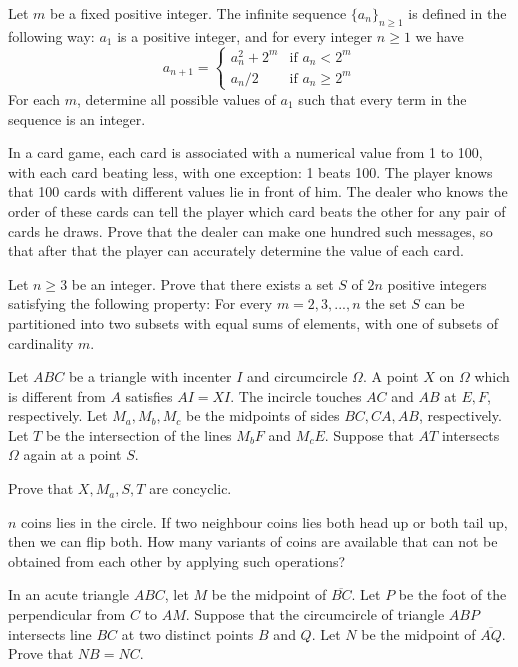 \documentclass[11pt]{scrartcl}
\begin{document}
\begin{problem}[613109155420064]
Let $m$ be a fixed positive integer. The infinite sequence $\{a_n\}_{n\geq 1}$ is defined in the following way: $a_1$ is a positive integer, and for every integer $n\geq 1$ we have
$$a_{n+1} = \begin{cases}a_n^2+2^m & \text{if } a_n< 2^m \\ a_n/2 &\text{if } a_n\geq 2^m\end{cases}$$For each $m$, determine all possible values of $a_1$ such that every term in the sequence is an integer.
\end{problem}
\begin{problem}[4059278924956282558]
In a card game, each card is associated with a numerical value from 1 to 100, with each card beating less, with one exception: 1 beats 100. The player knows that 100 cards with different values lie in front of him. The dealer who knows the order of these cards can tell the player which card beats the other for any pair of cards he draws. Prove that the dealer can make one hundred such messages, so that after that the player can accurately determine the value of each card.
\end{problem}
\begin{problem}[8059760967121829853]
	Let $n\geqslant 3$ be an integer. Prove that there exists a set $S$ of $2n$ positive integers satisfying the following property: For every $m=2,3,...,n$ the set $S$ can be partitioned into two subsets with equal sums of elements, with one of subsets of cardinality $m$.
\end{problem}
\begin{problem}[727078403801409]
Let $ABC$ be a triangle with incenter $I$ and circumcircle $\Omega$. A point $X$ on $\Omega$ which is different from $A$ satisfies $AI=XI$. The incircle touches $AC$ and $AB$ at $E, F$, respectively. Let $M_a, M_b, M_c$ be the midpoints of sides $BC, CA, AB$, respectively. Let $T$ be the intersection of the lines $M_bF$ and $M_cE$. Suppose that $AT$ intersects $\Omega$ again at a point $S$.

Prove that $X, M_a, S, T$ are concyclic.
\end{problem}
\begin{problem}[937132258882447]
	$n$ coins lies in the circle. If two neighbour coins lies both head up or both tail up, then we can flip both. How many variants of coins are available that can not be obtained from each other by applying such operations?
\end{problem}
\begin{problem}[9137209985622350774]
	In an acute triangle $ABC$, let $M$ be the midpoint of $\overline{BC}$. Let $P$ be the foot of the perpendicular from $C$ to $AM$. Suppose that the circumcircle of triangle $ABP$ intersects line $BC$ at two distinct points $B$ and $Q$. Let $N$ be the midpoint of $\overline{AQ}$. Prove that $NB=NC$.
\end{problem}
\end{document}
